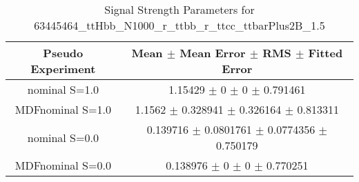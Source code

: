 \begin{table}
\centering
\caption{Signal Strength Parameters for 63445464\_ttHbb\_N1000\_r\_ttbb\_r\_ttcc\_ttbarPlus2B\_1.5}
\begin{tabular}{cc}
\toprule
Pseudo Experiment & Mean $\pm$ Mean Error $\pm$ RMS $\pm$ Fitted Error\\
\midrule
nominal S=1.0 & \num{1.15429} $\pm$ \num{0} $\pm$ \num{0} $\pm$ \num{0.791461}\\
MDFnominal S=1.0 & \num{1.1562} $\pm$ \num{0.328941} $\pm$ \num{0.326164} $\pm$ \num{0.813311}\\
nominal S=0.0 & \num{0.139716} $\pm$ \num{0.0801761} $\pm$ \num{0.0774356} $\pm$ \num{0.750179}\\
MDFnominal S=0.0 & \num{0.138976} $\pm$ \num{0} $\pm$ \num{0} $\pm$ \num{0.770251}\\
\bottomrule
\end{tabular}
\end{table}